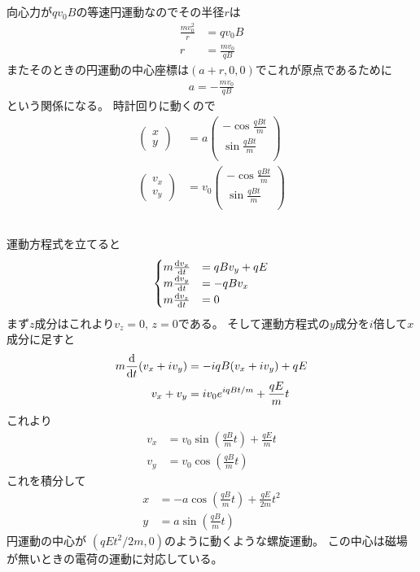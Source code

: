 \documentclass[../../master.tex]{subfiles}
\begin{document}
\subsection{}
向心力が\(qv_0B\)の等速円運動なのでその半径\(r\)は
\begin{align}
    \frac{mv_0^2}{r} &= qv_0 B\\
    r &= \frac{mv_0}{qB}
\end{align}
またそのときの円運動の中心座標は\((a+r,0,0)\)でこれが原点であるために
\begin{align}
    a = -\frac{mv_0}{qB}
\end{align}
という関係になる。
時計回りに動くので
\begin{align}
    \begin{pmatrix}
        x\\y
    \end{pmatrix}
    &= a\begin{pmatrix}
        -\cos\frac{qB t}{m}\\
        \sin\frac{qB t}{m}\\
    \end{pmatrix}\\
    \begin{pmatrix}
        v_x\\v_y
    \end{pmatrix}
    &= v_0\begin{pmatrix}
        -\cos\frac{qB t}{m}\\
        \sin\frac{qB t}{m}\\
    \end{pmatrix}
\end{align}

\subsection{}
運動方程式を立てると
\begin{align}
    \begin{cases}
        m\dv{v_x}{t} &= qB v_y +qE\\
        m\dv{v_y}{t} &= -qB v_x\\
        m\dv{v_z}{t} &= 0
    \end{cases}
\end{align}
まず\(z\)成分はこれより\(v_z=0,\,z=0\)である。
そして運動方程式の\(y\)成分を\(i\)倍して\(x\)成分に足すと
\begin{align}
    m\dv{t} (v_x+iv_y) &= -iqB(v_x+iv_y) +qE\\
    v_x + v_y &= iv_0 e^{iqBt/m} + \frac{qE}{m}t
\end{align}
これより
\begin{align}
    v_x &= v_0 \sin(\frac{qB}{m}t)+\frac{qE}{m}t\\
    v_y &= v_0 \cos(\frac{qB}{m}t)
\end{align}
これを積分して
\begin{align}
    x &= -a \cos(\frac{qB}{m}t)+\frac{qE}{2m}t^2\\
    y &= a \sin(\frac{qB}{m}t)
\end{align}
円運動の中心が \((qEt^2/2m, 0)\)のように動くような螺旋運動。
この中心は磁場が無いときの電荷の運動に対応している。
\end{document}
